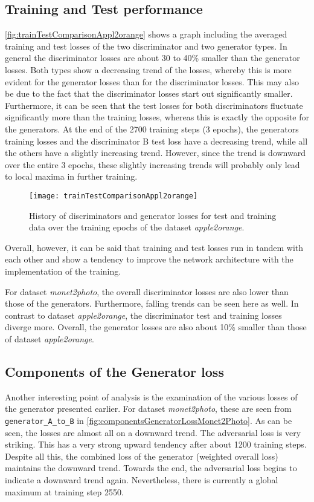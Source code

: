 \documentclass[fleqn,10pt]{SelfArx} %
\begin{document}
\subsection{Training and Test performance}
\autoref{fig:trainTestComparisonAppl2orange} shows a graph including the averaged training and test losses of the two discriminator and two generator types. In general the discriminator losses are about 30 to 40\% smaller than the generator losses. Both types show a decreasing trend of the losses, whereby this is more evident for the generator losses than for the discriminator losses. This may also be due to the fact that the discriminator losses start out significantly smaller. Furthermore, it can be seen that the test losses for both discriminators fluctuate significantly more than the training losses, whereas this is exactly the opposite for the generators. At the end of the 2700 training steps (3 epochs), the generators training losses and the discriminator B test loss have a decreasing trend, while all the others have a slightly increasing trend. However, since the trend is downward over the entire 3 epochs, these slightly increasing trends will probably only lead to local maxima in further training.

\begin{figure}[htb] 
	\centering 
	\texttt{[image: trainTestComparisonAppl2orange]}
	\caption{History of discriminators and generator losses for test and training data over the training epochs of the dataset \textit{apple2orange}.}
	\label{fig:trainTestComparisonAppl2orange}
\end{figure}

Overall, however, it can be said that training and test losses run in tandem with each other and show a tendency to improve the network architecture with the implementation of the training.

For dataset \textit{monet2photo}, the overall discriminator losses are also lower than those of the generators. Furthermore, falling trends can be seen here as well. In contrast to dataset \textit{apple2orange}, the discriminator test and training losses diverge more. Overall, the generator losses are also about 10\% smaller than those of dataset \textit{apple2orange}.

\subsection{Components of the Generator loss}
Another interesting point of analysis is the examination of the various losses of the generator presented earlier. For dataset \textit{monet2photo}, these are seen from \texttt{generator\_A\_to\_B} in \autoref{fig:componentsGeneratorLossMonet2Photo}. As can be seen, the losses are almost all on a downward trend. The adversarial loss is very striking. This has a very strong upward tendency after about 1200 training steps. Despite all this, the combined loss of the generator (weighted overall loss) maintains the downward trend. Towards the end, the adversarial loss begins to indicate a downward trend again. Nevertheless, there is currently a global maximum at training step 2550.
\end{document}
